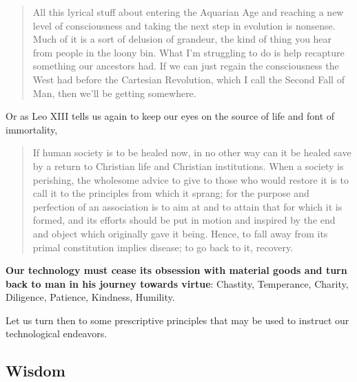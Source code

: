 \documentclass[letterpaper]{article}
\begin{document}
\begin{quote}
  All this lyrical stuff about entering the Aquarian Age and reaching a new level of consciousness and taking the next step in evolution is nonsense. Much of it is a sort of delusion of grandeur, the kind of thing you hear from people in the loony bin. What I'm struggling to do is help recapture something our ancestors had. If we can just regain the consciousness the West had before the Cartesian Revolution, which I call the Second Fall of Man, then we'll be getting somewhere.

\end{quote}

Or as Leo XIII tells us again to keep our eyes on the source of life and font of immortality,

\begin{quote}
  If human society is to be healed now, in no other way can it be healed save by a return to Christian life and Christian institutions. When a society is perishing, the wholesome advice to give to those who would restore it is to call it to the principles from which it sprang; for the purpose and perfection of an association is to aim at and to attain that for which it is formed, and its efforts should be put in motion and inspired by the end and object which originally gave it being. Hence, to fall away from its primal constitution implies disease; to go back to it, recovery.
\end{quote}

\textbf{Our technology must cease its obsession with material goods and turn back to man in his journey towards virtue}: Chastity, Temperance, Charity, Diligence, Patience, Kindness, Humility.

Let us turn then to some prescriptive principles that may be used to instruct our technological endeavors.

\subsection{Wisdom}
\end{document}
